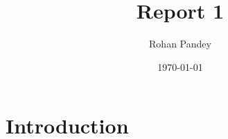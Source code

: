 \documentclass[12pt]{article}
\title{Report 1}
\author{Rohan Pandey}
\date{\today}
\begin{document}
\maketitle

\section{Introduction}
\end{document}

